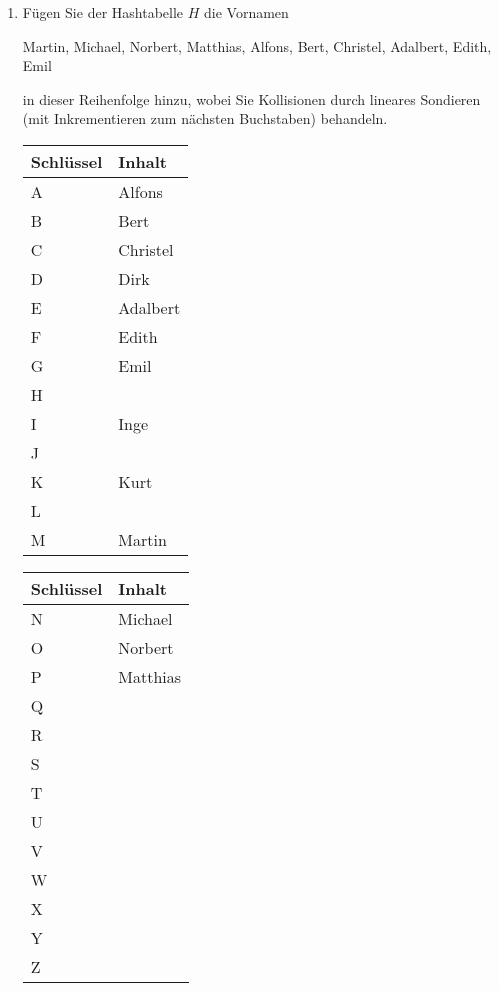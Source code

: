 \documentclass{bschlangaul-aufgabe}
\begin{document}
\begin{enumerate}

\item Fügen Sie der Hashtabelle $H$ die Vornamen

\begin{center}
Martin, Michael, Norbert, Matthias, Alfons, Bert, Christel, Adalbert,
Edith, Emil
\end{center}

in dieser Reihenfolge hinzu, wobei Sie Kollisionen durch lineares
Sondieren (mit Inkrementieren zum nächsten Buchstaben) behandeln.

\begin{bAntwort}
\begin{multicols}{2}
\noindent
\begin{tabularx}{\linewidth}{|l||X|}
\hline
Schlüssel & Inhalt \\\hline\hline
A & Alfons \\\hline
B & Bert \\\hline
C & Christel \\\hline
D & Dirk \\\hline
E & Adalbert \\\hline
F & Edith \\\hline
G & Emil \\\hline
H & \\\hline
I & Inge \\\hline
J & \\\hline
K & Kurt \\\hline
L & \\\hline
M & Martin \\\hline
\end{tabularx}

\noindent
\begin{tabularx}{\linewidth}{|l||X|}
\hline
Schlüssel & Inhalt \\\hline\hline
N & Michael \\\hline
O & Norbert \\\hline
P & Matthias \\\hline
Q & \\\hline
R & \\\hline
S & \\\hline
T & \\\hline
U & \\\hline
V & \\\hline
W & \\\hline
X & \\\hline
Y & \\\hline
Z & \\\hline
\end{tabularx}
\end{multicols}
\bigskip
\end{bAntwort}


\end{enumerate}
\end{document}
